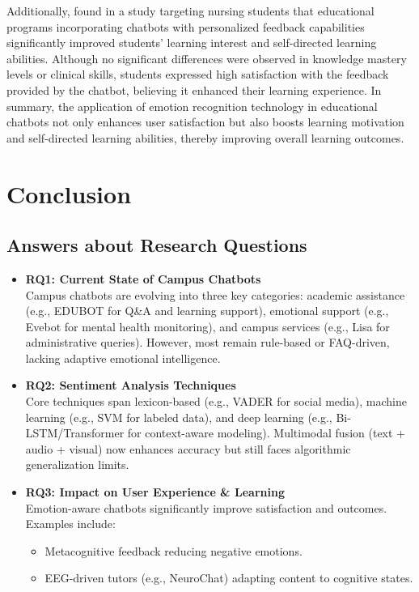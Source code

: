 \documentclass{xum_review}
\begin{document}
Additionally, \citet{han2022development} found in a study targeting nursing
students that educational programs incorporating chatbots with personalized
feedback capabilities significantly improved students' learning interest and
self-directed learning abilities. Although no significant differences were
observed in knowledge mastery levels or clinical skills, students expressed high
satisfaction with the feedback provided by the chatbot, believing it enhanced
their learning experience. In summary, the application of emotion recognition
technology in educational chatbots not only enhances user satisfaction but also
boosts learning motivation and self-directed learning abilities, thereby
improving overall learning outcomes.

\section{Conclusion}

\subsection{Answers about Research Questions}

\begin{itemize}
    \item \textbf{RQ1: Current State of Campus Chatbots}\\Campus chatbots are evolving
    into three key categories: academic assistance (e.g., EDUBOT for Q\&A and
    learning support), emotional support (e.g., Evebot for mental health
    monitoring), and campus services (e.g., Lisa for administrative queries).
    However, most remain rule-based or FAQ-driven, lacking adaptive emotional
    intelligence.

    \item \textbf{RQ2: Sentiment Analysis Techniques}\\Core techniques span lexicon-based (e.g., VADER for social
    media), machine learning (e.g., SVM for labeled data), and deep learning
    (e.g., Bi-LSTM/Transformer for context-aware modeling). Multimodal fusion
    (text + audio + visual) now enhances accuracy but still faces algorithmic
    generalization limits.

    \item \textbf{RQ3: Impact on User Experience \& Learning}\\Emotion-aware
    chatbots significantly improve satisfaction and outcomes. Examples include:
    \begin{itemize}
        \item Metacognitive feedback reducing negative emotions.
        \item EEG-driven tutors (e.g., NeuroChat) adapting content to cognitive
        states.
    \end{itemize}
\end{itemize}
\end{document}
